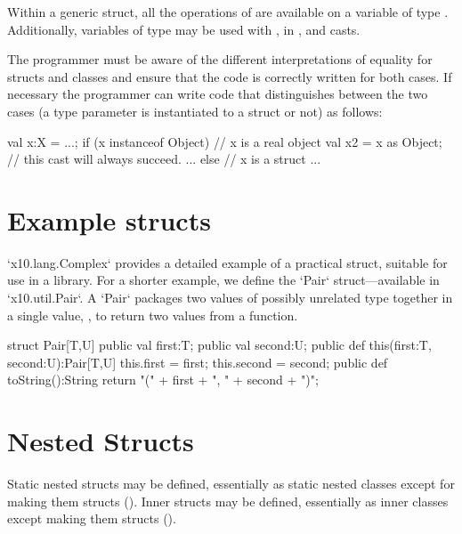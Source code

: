 Within a generic struct, all the operations of  are available
on a variable of type . Additionally, variables of type  may
be used with \Xcd{==, !=}, in , and casts.

The programmer must be aware of the different interpretations of
equality for structs and classes and ensure that the code is correctly
written for both cases. If necessary the programmer can write code
that distinguishes between the two cases (a type parameter  is
instantiated to a struct or not) as follows:

\begin{xten}
val x:X = ...;
if (x instanceof Object) { // x is a real object
   val x2 = x as Object; // this cast will always succeed.
   ...
} else { // x is a struct
   ...
}
\end{xten}
 
  
\section{Example structs}

\xcd`x10.lang.Complex` provides a detailed example of a practical struct,
suitable for use in a library.  For a shorter example, we define the
\xcd`Pair` struct---available in \xcd`x10.util.Pair`.  A \xcd`Pair` packages
two values of possibly unrelated type together in a single value, \eg, to
return two values from a function.

\begin{xten}
struct Pair[T,U] {
    public val first:T;
    public val second:U;
    public def this(first:T, second:U):Pair[T,U] {
        this.first = first;
        this.second = second;
    }
    public def toString():String {
        return "(" + first + ", " + second + ")";
    }
}
\end{xten}
%

\section{Nested Structs}

Static nested structs may be defined, essentially as static nested classes
except for making them structs
().  Inner structs may be defined, essentially as
inner classes except making them structs ().

